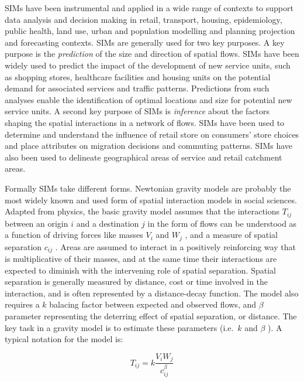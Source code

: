 \documentclass[11pt,letterpaper]{article}
\begin{document}
SIMs have been instrumental and applied in a wide range of contexts to support data analysis and decision making in retail, transport, housing, epidemiology, public health, land use, urban and population modelling and planning projection and forecasting contexts.
SIMs are generally used for two key purposes.
A key purpose is the \emph{prediction} of the size and direction of spatial flows.
SIMs have been widely used to predict the impact of the development of new service units, such as shopping stores, healthcare facilities and housing units on the potential demand for associated services and traffic patterns.
Predictions from such analyses enable the identification of optimal locations and size for potential new service units.
A second key purpose of SIMs is \emph{inference} about the factors shaping the spatial interactions in a network of flows.
SIMs have been used to determine and understand the influence of retail store on consumers' store choices and place attributes on migration decisions and commuting patterns.
SIMs have also been used to delineate geographical areas of service and retail catchment areas.

Formally SIMs take different forms.
Newtonian gravity models are probably the most widely known and used form of spatial interaction models in social sciences.
Adapted from physics, the basic gravity model assumes that the interactions \(T_{i j}\) between an origin \(i\) and a destination \(j\) in the form of flows can be understood as a function of driving forces like masses \(V_{i}\) and \(W_{j}\) , and a measure of spatial separation \(c_{ij}\) .
Areas are assumed to interact in a positively reinforcing way that is multiplicative of their masses, and at the same time their interactions are expected to diminish with the intervening role of spatial separation.
Spatial separation is generally measured by distance, cost or time involved in the interaction, and is often represented by a distance-decay function.
The model also requires a \(k\) balacing factor between expected and observed flows, and \(\beta\) parameter representing the deterring effect of spatial separation, or distance.
The key task in a gravity model is to estimate these parameters (i.e.~\(k\) and \(\beta\) ).
A typical notation for the model is:

\[
T_{i j}=k \frac{V_{i} W_{j}}{c_{i j}^{\beta}}
\]
\end{document}
